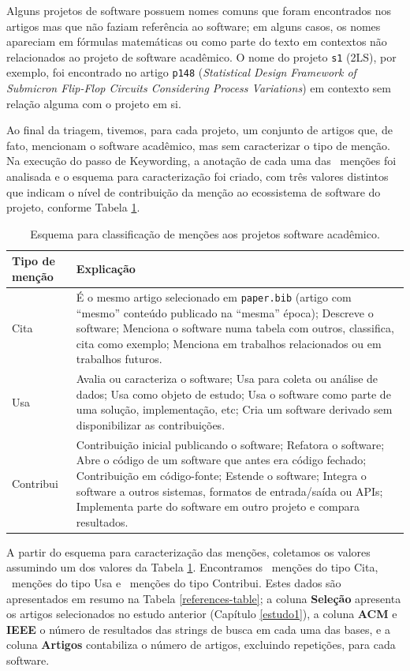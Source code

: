 Alguns projetos de software possuem nomes comuns que foram encontrados nos
artigos mas que não faziam referência ao software; em alguns casos, os nomes
apareciam em fórmulas matemáticas ou como parte do texto em contextos não
relacionados ao projeto de software acadêmico. O nome do projeto \texttt{s1}
(2LS), por exemplo, foi encontrado no artigo \texttt{p148} ({\it Statistical Design
Framework of Submicron Flip-Flop Circuits Considering Process Variations}) em
contexto sem relação alguma com o projeto em si.

Ao final da triagem, tivemos, para cada projeto, um conjunto de artigos que, de
fato, mencionam o software acadêmico, mas sem caracterizar o tipo de menção.
Na execução do passo de Keywording, 
a anotação de cada uma das \ScreeningCount \ menções foi analisada e o
esquema para caracterização foi criado, com três valores distintos que
indicam o nível de contribuição da menção ao ecossistema de software do projeto,
conforme Tabela \ref{esquema-de-mencao}.

\begin{table}[h]
\caption{Esquema para classificação de menções aos projetos software acadêmico.}
\centering
\begin{tabular}{ l p{10cm} }
  \hline
  Tipo de menção           & Explicação \\
  \hline
  Cita      & É o mesmo artigo selecionado em \texttt{paper.bib} (artigo com ``mesmo'' conteúdo publicado na ``mesma'' época); Descreve o software; Menciona o software numa tabela com outros, classifica, cita como exemplo; Menciona em trabalhos relacionados ou em trabalhos futuros. \\
  Usa       & Avalia ou caracteriza o software; Usa para coleta ou análise de dados; Usa como objeto de estudo; Usa o software como parte de uma solução, implementação, etc; Cria um software derivado sem disponibilizar as contribuições. \\
  Contribui & Contribuição inicial publicando o software; Refatora o software; Abre o código de um software que antes era código fechado; Contribuição em código-fonte; Estende o software; Integra o software a outros sistemas, formatos de entrada/saída ou APIs; Implementa parte do software em outro projeto e compara resultados. \\
  \hline
\end{tabular}
\label{esquema-de-mencao}
\end{table}

A partir do esquema para caracterização das menções, coletamos os valores
assumindo um dos valores da Tabela \ref{esquema-de-mencao}. Encontramos
\CiteCount \ menções do tipo Cita, \UseCount \ menções do tipo Usa e
\ContributeCount \ menções do tipo Contribui. Estes dados são
apresentados em resumo na Tabela \ref{references-table};
a coluna {\bf Seleção} apresenta os artigos
selecionados no estudo anterior (Capítulo \ref{estudo1}), a coluna {\bf ACM} e
{\bf IEEE} o número de resultados das strings de busca em cada uma das bases, e
a coluna {\bf Artigos} contabiliza o número de artigos, excluindo
repetições, para cada software.

